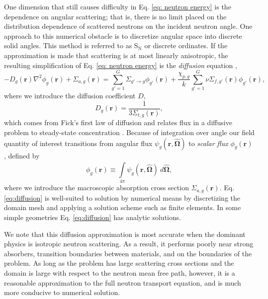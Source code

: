One dimension that still causes difficulty in Eq. \ref{eq: neutron energy} is the dependence on angular
scattering; that is, there is no limit placed on the distribution dependence of scattered neutrons on the
incident neutron angle.  One approach to this numerical obstacle is to discretize angular space into discrete
solid angles.  This method is referred to as S$_\text{N}$ or discrete ordinates.  If the approximation
is made that scattering is at most linearly anisotropic, the resulting simplification of Eq. \ref{eq: neutron energy}
is the \emph{diffusion} equation \cite{duderstadt},
\begin{equation}\label{eq:diffusion}
  -D_g(\mathbf{r})\nabla^2\phi_g(\mathbf{r}) + \Sigma_{a,g}(\mathbf{r}) =
  \sum_{g'=1}^G \Sigma_{g'\to g}\phi_{g'}(\mathbf{r}) + 
  \frac{\chi_{p,g}}{k}\sum_{g'=1}^G \nu\Sigma_{f,g'}(\mathbf{r})\phi_{g'}(\mathbf{r}),
\end{equation}
where we introduce the diffusion coefficient $D$,
\begin{equation}
  D_g(\mathbf{r}) = \frac{1}{3\Sigma_{t,g}(\mathbf{r})},
\end{equation}
which comes from Fick's first law of diffusion and relates flux in a diffusive problem to steady-state
concentration \cite{lewis}.
Because of integration over angle our field quantity of interest transitions from angular flux
$\psi_g(\mathbf{r},\mathbf{\hat\Omega})$ to \emph{scalar flux} $\phi_g(\mathbf{r})$, defined by
\begin{equation}
  \phi_g(\mathbf{r}) \equiv \int\limits_{4\pi}^{} \psi_g(\mathbf{r},\mathbf{\hat\Omega})\
  d\mathbf{\hat\Omega},
\end{equation}
where we introduce the macroscopic absorption cross section $\Sigma_{a,g}(\mathbf{r})$.  Eq. \ref{eq:diffusion} is
well-suited to solution by numerical means by discretizing the domain mesh and applying a solution scheme such
as finite elements.  In some simple geometries Eq. \ref{eq:diffusion} has analytic solutions.  

We note
that this diffusion approximation is most accurate when the dominant physics is isotropic neutron scattering.  
As a result, it
performs poorly near strong absorbers, transition boundaries between materials, and on the boundaries of the
problem.  As long as the problem has large scattering cross sections and the domain is large with respect to
the neutron mean free path, however, it is a reasonable
approximation to the full neutron transport equation, and is much more conducive to numerical solution.

